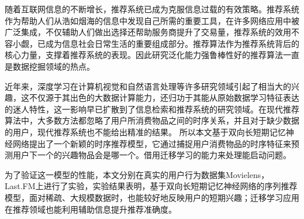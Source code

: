 \begin{cabstract}

    随着互联网信息的不断增长，推荐系统已成为克服信息过载的有效策略。推荐系统作为帮助人们从浩如烟海的信息中发现自己所需的重要工具，在许多网络应用中被广泛集成，不仅辅助人们做出选择还帮助服务商提升了交易量，推荐系统的效用不容小觑，已成为信息社会日常生活的重要组成部分。推荐算法作为推荐系统背后的核心力量，支撑着推荐系统的表现。因此研究泛化能力强鲁棒性好的推荐算法一直是数据挖掘领域的热点。

    近年来，深度学习在计算机视觉和自然语言处理等许多研究领域引起了相当大的兴趣，这不仅源于其出色的大数据计算能力，还归功于其能从原始数据学习特征表达的迷人特性，这一影响早已扩散到了信息检索和推荐系统的研究领域。在现代推荐算法中，大多数方法都忽略了用户所消费物品之间的时序关系，并且对于缺少数据的用户，现代推荐系统也不能给出精准的结果。	所以本文基于双向长短期记忆神经网络提出了一个新颖的时序推荐模型，它通过捕捉用户消费物品的时序特征来预测用户下一个的兴趣物品会是哪一个。借用迁移学习的能力来处理能启动问题。

    为了验证这一模型的性能，本文分别在真实的用户行为数据集Movielens，Last.FM上进行了实验，实验结果表明，基于双向长短期记忆神经网络的序列推荐模型，面对稀疏、大规模数据时，也能较好地反映用户的短期兴趣；迁移学习应用在推荐领域也能利用辅助信息提升推荐准确度。

\end{cabstract}

\begin{eabstract}

\end{eabstract}

